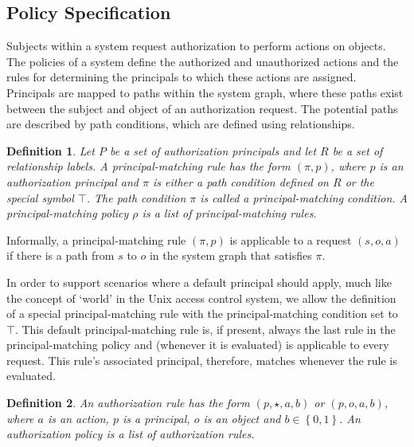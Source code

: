 \documentclass{article}
\newtheorem{definition}{Definition}
\newcommand{\set}[1]{\ensuremath{\left\{#1\right\}}} \newcommand{\sett}[1]{\ensuremath{\left\{\textit{#1}\right\}}} \newcommand{\tuple}[1]{\ensuremath{\left(#1\right)}} \newcommand{\tuplet}[1]{\ensuremath{\left(\textit{#1}\right)}}
\begin{document}
\subsection{Policy Specification}\label{sec:AuthZModel:PolicySpec}

Subjects within a system request authorization to perform actions on objects. The policies of a system define the authorized and unauthorized actions and the rules for determining the principals to which these actions are assigned. Principals are mapped to paths within the system graph, where these paths exist between the subject and object of an authorization request. The potential paths are described by path conditions, which are defined using relationships.

\begin{definition}
     Let $P$ be a set of \emph{authorization principals} and let $R$ be a set of relationship labels.
     A \emph{principal-matching rule} has the form $(\pi, p)$, where $p$ is an authorization principal and $\pi$ is either a path condition defined on $R$ or the special symbol $\top$.
     The path condition $\pi$ is called a \emph{principal-matching condition}. A \emph{principal-matching policy} $\rho$ is a list of principal-matching rules.
\end{definition}

Informally, a principal-matching rule $(\pi,p)$ is applicable to a request $(s,o,a)$ if there is a path from $s$ to $o$ in the system graph that satisfies $\pi$.

In order to support scenarios where a default principal should apply, much like the concept of `world' in the Unix access control system, we allow the definition of a special principal-matching rule with the principal-matching condition set to $\top$.
This default principal-matching rule is, if present, always the last rule in the principal-matching policy and (whenever it is evaluated) is applicable to every request.
This rule's associated principal, therefore, matches whenever the rule is evaluated.

\begin{definition}
    An \emph{authorization rule} has the form $(p,\star,a,b)$ or $(p,o,a,b)$, where $a$ is an action, $p$ is a principal, $o$ is an object and $b \in \set{0,1}$.
An \emph{authorization policy} is a list of authorization rules.
\end{definition}
\end{document}
